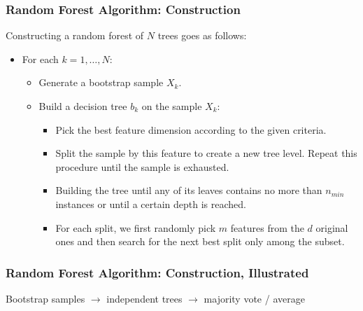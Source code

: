 \begin{frame}[fragile]\frametitle{Random Forest Algorithm: Construction}
Constructing a random forest of $N$ trees goes as follows:
\begin{itemize}
\item For each $k = 1, \dots, N$:
\begin{itemize}
\item  Generate a bootstrap sample $X_k$.
\item  Build a decision tree $b_k$ on the sample $X_k$:
\begin{itemize}
\item Pick the best feature dimension according to the given criteria.
\item Split the sample by this feature to create a new tree level. Repeat this procedure until the sample is exhausted.
\item Building the tree until any of its leaves contains no more than $n_{min}$ instances or until a certain depth is reached.
\item For each split, we first randomly pick $m$ features from the $d$ original ones and then search for the next best split only among the subset.
\end{itemize}
\end{itemize}
\end{itemize}
\end{frame}

\begin{frame}[fragile]\frametitle{Random Forest Algorithm: Construction, Illustrated}
\begin{center}
\end{center}
Bootstrap samples $\to$ independent trees $\to$ majority vote / average
\end{frame}


